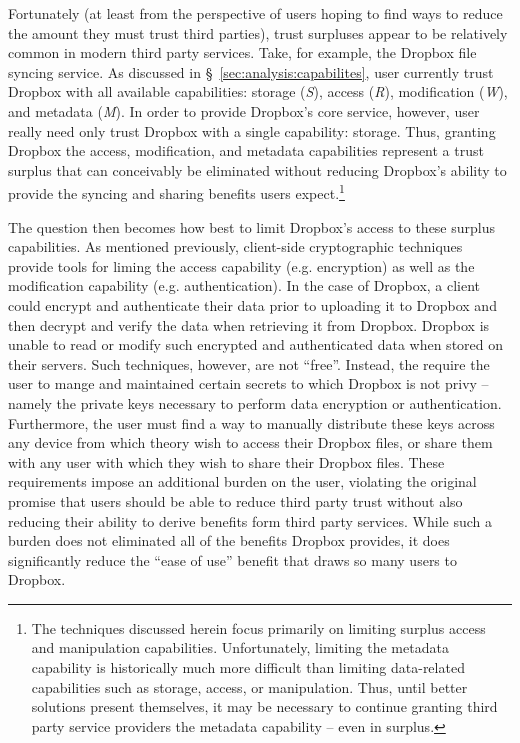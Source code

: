 Fortunately (at least from the perspective of users hoping to find
ways to reduce the amount they must trust third parties), trust
surpluses appear to be relatively common in modern third party
services. Take, for example, the Dropbox file syncing service. As
discussed in \S~\ref{sec:analysis:capabilites}, user currently trust
Dropbox with all available capabilities: storage (\emph{S}), access
(\emph{R}), modification (\emph{W}), and metadata (\emph{M}). In order
to provide Dropbox's core service, however, user really need only
trust Dropbox with a single capability: storage. Thus, granting
Dropbox the access, modification, and metadata capabilities represent
a trust surplus that can conceivably be eliminated without reducing
Dropbox's ability to provide the syncing and sharing benefits users
expect.\footnote{The techniques discussed herein focus primarily on
  limiting surplus access and manipulation capabilities. Unfortunately,
  limiting the metadata capability is historically much more difficult
  than limiting data-related capabilities such as storage, access, or
  manipulation. Thus, until better solutions present themselves, it
  may be necessary to continue granting third party service providers
  the metadata capability -- even in surplus.}

The question then becomes how best to limit Dropbox's access to these
surplus capabilities. As mentioned previously, client-side
cryptographic techniques provide tools for liming the access
capability (e.g. encryption) as well as the modification capability
(e.g. authentication). In the case of Dropbox, a client could encrypt
and authenticate their data prior to uploading it to Dropbox and then
decrypt and verify the data when retrieving it from Dropbox. Dropbox
is unable to read or modify such encrypted and authenticated data when
stored on their servers. Such techniques, however, are not
``free''. Instead, the require the user to mange and maintained
certain secrets to which Dropbox is not privy -- namely the private
keys necessary to perform data encryption or
authentication. Furthermore, the user must find a way to manually
distribute these keys across any device from which theory wish to
access their Dropbox files, or share them with any user with which
they wish to share their Dropbox files. These requirements impose an
additional burden on the user, violating the original promise that
users should be able to reduce third party trust without also reducing
their ability to derive benefits form third party services. While such
a burden does not eliminated all of the benefits Dropbox provides, it
does significantly reduce the ``ease of use'' benefit that draws so
many users to Dropbox.

